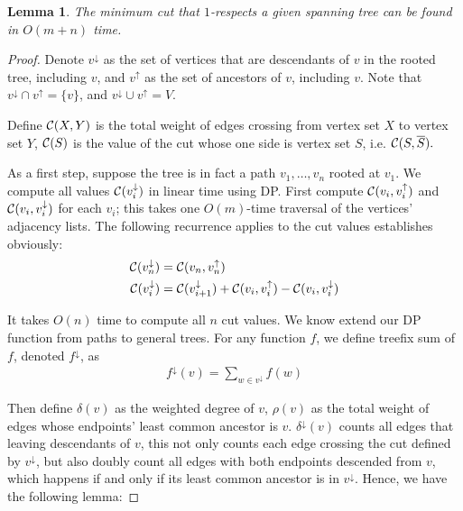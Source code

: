 \documentclass[11pt]{article}
\newcommand{\descendants}[1]{#1^\downarrow}
\newcommand{\ancestors}[1]{{#1}^\uparrow}
\newcommand{\cutval}[1]{{\cal C}(#1)}
\newcommand{\crossweight}[2]{{\cal C}(#1,#2)}
\theoremstyle{plain}
\newtheorem{lemma}{Lemma}[section]
\begin{document}
\begin{lemma}
    The minimum cut that $1$-respects a given spanning tree can be found in $O(m+n)$ time.
\end{lemma}

\begin{proof}
    Denote $\descendants{v}$ as the set of vertices that are descendants of $v$ in the rooted tree, including $v$, and $\ancestors{v}$ as the set of ancestors of $v$, including $v$. Note that $\descendants{v}\cap\ancestors{v}=\{v\}$, and $\descendants{v}\cup\ancestors{v}=V$.

    Define $\crossweight{X}{Y}$ is the total weight of edges crossing from vertex set $X$ to vertex set $Y$, $\cutval{S}$ is the value of the cut whose one side is vertex set $S$, i.e. $\crossweight{S}{\overline{S}}.$

    As a first step, suppose the tree is in fact a path $v_1,\ldots,v_n$ rooted at $v_1$.  We compute all values $\cutval{\descendants{v_i}}$ in linear time using DP. First compute $\crossweight{v_i}{\ancestors{v}_i}$ and $\crossweight{v_i}{\descendants{v}_i}$ for each $v_i$; this takes one $O(m)$-time traversal of the vertices' adjacency lists. The following recurrence applies to the cut values establishes obviously:
    \begin{align*}
    \cutval{\descendants{v_n}} &= \crossweight{v_n}{\ancestors{v}_n}\\ 
    \cutval{\descendants{v_i}} &= \cutval{\descendants{v}_{i+1}}+\crossweight{v_i}{\ancestors{v}_i} -\crossweight{v_i}{\descendants{v}_i}
    \end{align*}

    It takes $O(n)$ time to compute all $n$ cut values. We know extend our DP function from paths to general trees. For any function $f$, we define treefix sum of $f$, denoted $\descendants{f}$, as
    \begin{align*}
        \descendants{f}(v)=\sum_{w\in\descendants{v}}f(w)
    \end{align*}

    Then define $\delta(v)$ as the weighted degree of $v$, $\rho(v)$ as the total weight of edges whose endpoints' least common ancestor is $v$. $\descendants{\delta}(v)$ counts all edges that leaving descendants of $v$, this not only counts each edge crossing the cut defined by $\descendants{v}$, but also doubly count all edges with both endpoints descended from $v$, which happens if and only if its least common ancestor is in $\descendants{v}$. Hence, we have the following lemma:


\end{proof}
\end{document}
